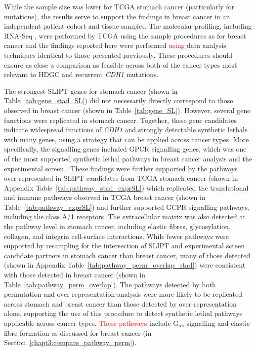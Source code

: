 While the sample size was lower for \gls{TCGA} stomach cancer (particularly for \glspl{mutation}), the results serve to support the findings in breast cancer in an independent patient cohort and tissue samples. The molecular profiling, including \gls{RNA-Seq} , were performed by \gls{TCGA} using the sample procedures as for breast cancer and the findings reported here were performed \textcolor{red}{using} data analysis techniques identical to those presented previously. These procedures should ensure as close a comparison as feasible across both of the cancer types most relevant to \gls{HDGC} and recurrent \textit{CDH1} \glspl{mutation}.

The strongest \gls{SLIPT} genes for stomach cancer (shown in Table~\ref{tab:gene_stad_SL}) did not necessarily directly correspond to those observed in breast cancer (shown in Table~\ref{tab:gene_SL}). However, several gene functions were replicated in stomach cancer. Together, these gene candidates indicate widespread functions of \textit{CDH1} and strongly detectable \glspl{synthetic lethal} with many genes, using a strategy that can be applied across cancer types. More specifically, the signalling genes included \gls{GPCR} signalling genes, which was one of the most supported \gls{synthetic lethal} \glspl{pathway} in breast cancer analysis and the experimental screen \citep{Telford2015}. %
These findings were further supported by the \glspl{pathway} over-represented in \gls{SLIPT} candidates from \gls{TCGA} stomach cancer (shown in Appendix Table~\ref{tab:pathway_stad_exprSL}) which replicated the translational and immune \glspl{pathway} observed in \gls{TCGA} breast cancer (shown in Table~\ref{tab:pathway_exprSL}) and further supported GCPR signalling \glspl{pathway}, including the class A/1 receptors. The extracellular matrix was also detected at the \gls{pathway} level in stomach cancer, including elastic fibres, glycosylation, collagen, and integrin cell-surface interactions. 
While fewer \glspl{pathway} were supported by resampling for the intersection of \gls{SLIPT} and experimental screen candidate partners in stomach cancer than breast cancer, many of those detected (shown in Appendix Table~\ref{tab:pathway_perm_overlap_stad}) were consistent with those detected in breast cancer (shown in Table~\ref{tab:pathway_perm_overlap}). The \glspl{pathway} detected by both permutation and over-representation analysis were more likely to be replicated across stomach and breast cancer than those detected by over-representation alone, supporting the use of this procedure to detect \gls{synthetic lethal} \glspl{pathway} applicable across cancer types. \textcolor{red}{These pathways} include G$_{\alpha s}$ signalling and elastic fibre formation as discussed for breast cancer (in Section~\ref{chapt3:compare_pathway_perm}).


